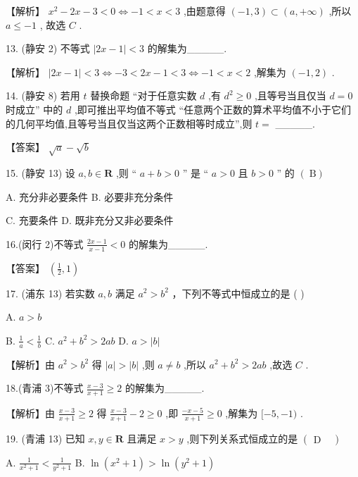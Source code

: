 \documentclass[10pt]{article}
\begin{document}
【解析】 \({x}^{2} - {2x} - 3 < 0 \Leftrightarrow   - 1 < x < 3\) ,由题意得 \(\left( {-1,3}\right)  \subset  \left( {a, + \infty }\right)\) ,所以 \(a \leq   - 1\) , 故选 \(C\) .

13. (静安 2) 不等式 \(\left| {{2x} - 1}\right|  < 3\) 的解集为\_\_\_\_\_.

【解析】 \(\left| {{2x} - 1}\right|  < 3 \Leftrightarrow   - 3 < {2x} - 1 < 3 \Leftrightarrow   - 1 < x < 2\) ,解集为 \(\left( {-1,2}\right)\) .

14. (静安 8) 若用 \(t\) 替换命题 “对于任意实数 \(d\) ,有 \({d}^{2} \geq  0\) ,且等号当且仅当 \(d = 0\) 时成立” 中的 \(d\) ,即可推出平均值不等式 “任意两个正数的算术平均值不小于它们的几何平均值,且等号当且仅当这两个正数相等时成立”,则 \(t =\) \_\_\_\_\_.

【答案】 \(\sqrt{a} - \sqrt{b}\)

15. (静安 13) 设 \(a,b \in  \mathbf{R}\) ,则 “ \(a + b > 0\) ” 是 “ \(a > 0\) 且 \(b > 0\) ” 的 \(\left( {\mathrm{\;B} }\right)\)

A. 充分非必要条件 B. 必要非充分条件

C. 充要条件 D. 既非充分又非必要条件

16.(闵行 2)不等式 \(\frac{{2x} - 1}{x - 1} < 0\) 的解集为\_\_\_\_\_.

【答案】 \(\left( {\frac{1}{2},1}\right)\)

17. (浦东 13) 若实数 \(a,b\) 满足 \({a}^{2} > {b}^{2}\) ，下列不等式中恒成立的是 ( )

A. \(a > b\)

B. \(\frac{1}{a} < \frac{1}{b}\) C. \({a}^{2} + {b}^{2} > {2ab}\) D. \(a > \left| b\right|\)

【解析】由 \({a}^{2} > {b}^{2}\) 得 \(\left| a\right|  > \left| b\right|\) ,则 \(a \neq  b\) ,所以 \({a}^{2} + {b}^{2} > {2ab}\) ,故选 \(C\) .

18.(青浦 3)不等式 \(\frac{x - 3}{x + 1} \geq  2\) 的解集为\_\_\_\_\_.

【解析】由 \(\frac{x - 3}{x + 1} \geq  2\) 得 \(\frac{x - 3}{x + 1} - 2 \geq  0\) ,即 \(\frac{-x - 5}{x + 1} \geq  0\) ,解集为 \(\lbrack  - 5, - 1)\) .

19. (青浦 13) 已知 \(x,y \in  \mathbf{R}\) 且满足 \(x > y\) ,则下列关系式恒成立的是 \(\left( \begin{array}{ll} \mathrm{D} &  \end{array}\right)\)

A. \(\frac{1}{{x}^{2} + 1} < \frac{1}{{y}^{2} + 1}\) B. \(\ln \left( {{x}^{2} + 1}\right)  > \ln \left( {{y}^{2} + 1}\right)\)
\end{document}
